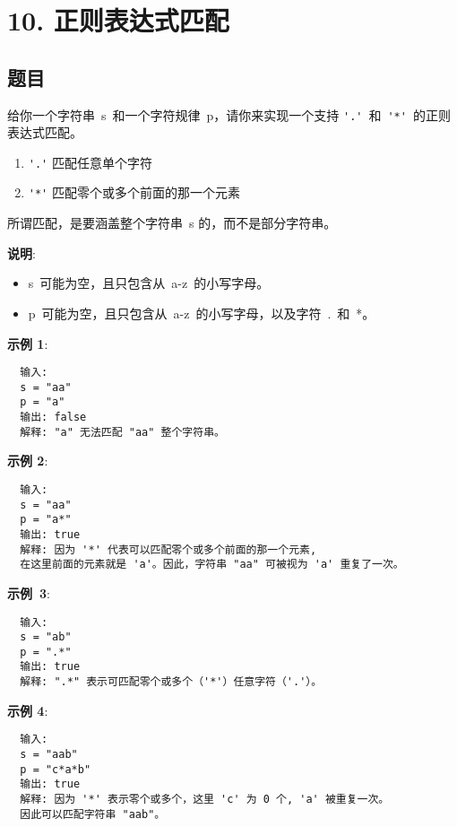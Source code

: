 \newpage
\section{10. 正则表达式匹配}
\label{leetcode:10}

\subsection{题目}

给你一个字符串 s 和一个字符规律 p，请你来实现一个支持 \verb|'.'| 和 \verb|'*'| 的正则表达式匹配。

\begin{enumerate}
  \item \verb|'.'| 匹配任意单个字符
  \item \verb|'*'| 匹配零个或多个前面的那一个元素
\end{enumerate}

所谓匹配，是要涵盖整个字符串 s 的，而不是部分字符串。

\textbf{说明}:

\begin{itemize}
  \item s 可能为空，且只包含从 a-z 的小写字母。
  \item p 可能为空，且只包含从 a-z 的小写字母，以及字符 . 和 *。
\end{itemize}

\textbf{示例 1}:

\begin{verbatim}
  输入:
  s = "aa"
  p = "a"
  输出: false
  解释: "a" 无法匹配 "aa" 整个字符串。
\end{verbatim}

\textbf{示例 2}:

\begin{verbatim}
  输入:
  s = "aa"
  p = "a*"
  输出: true
  解释: 因为 '*' 代表可以匹配零个或多个前面的那一个元素,
  在这里前面的元素就是 'a'。因此，字符串 "aa" 可被视为 'a' 重复了一次。
\end{verbatim}

\textbf{示例 3}:

\begin{verbatim}
  输入:
  s = "ab"
  p = ".*"
  输出: true
  解释: ".*" 表示可匹配零个或多个（'*'）任意字符（'.'）。
\end{verbatim}

\textbf{示例 4}:

\begin{verbatim}
  输入:
  s = "aab"
  p = "c*a*b"
  输出: true
  解释: 因为 '*' 表示零个或多个，这里 'c' 为 0 个, 'a' 被重复一次。
  因此可以匹配字符串 "aab"。
\end{verbatim}

